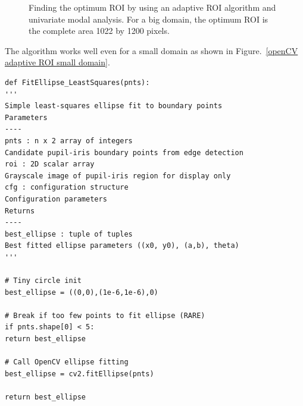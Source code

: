 \documentclass[12pt, twoside, a4paper]{article}
\begin{document}
\begin{figure}[!htbp]
	\caption{Finding the optimum ROI by using an adaptive ROI algorithm and univariate modal analysis. For a big domain, the optimum ROI is the complete area 1022 by 1200 pixels.
	}
	\label{openCV adaptive ROI big domain}
\end{figure}
%
The algorithm works well even for a small domain as shown in Figure.~\ref{openCV adaptive ROI small domain}.
%
\begin{verbatim}
def FitEllipse_LeastSquares(pnts):
'''
Simple least-squares ellipse fit to boundary points
Parameters
----
pnts : n x 2 array of integers
Candidate pupil-iris boundary points from edge detection
roi : 2D scalar array
Grayscale image of pupil-iris region for display only
cfg : configuration structure
Configuration parameters
Returns
----
best_ellipse : tuple of tuples
Best fitted ellipse parameters ((x0, y0), (a,b), theta)
'''

# Tiny circle init
best_ellipse = ((0,0),(1e-6,1e-6),0)

# Break if too few points to fit ellipse (RARE)
if pnts.shape[0] < 5:
return best_ellipse

# Call OpenCV ellipse fitting
best_ellipse = cv2.fitEllipse(pnts)

return best_ellipse
\end{verbatim}
%
%
\end{document}
